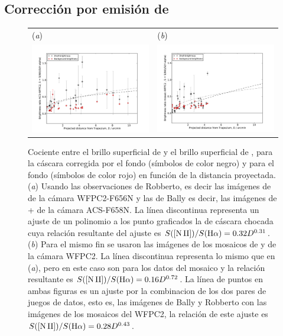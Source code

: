\subsection{Corrección por emisión de \nii{}}
\label{sec:comp}

\begin{figure}[htp]
\centering
\begin{tabular}{l l}
(\textit{a}) & (\textit{b})  \\
  \includegraphics[width=0.48\linewidth, trim=20 9.5 50 20, clip]{./acs_wfpc2-ratio-Nii_ha-vs-D_-mean-error_new}
& \includegraphics[width=0.48\linewidth, trim=20 9.5 50 20, clip]{./wfpc2-mosaic-ratio-Nii_ha-vs-D_-mean-error_new}\\
\end{tabular}
\caption{Cociente entre el brillo superficial de \nii{} y el brillo superficial de \ha{}, para la cáscara corregida por el fondo (símbolos de color negro) y para el fondo (símbolos de color rojo) en función de la distancia proyectada. (\textit{a}) Usando las observaciones de Robberto, es decir las imágenes de \ha{} de la cámara WFPC2-F656N y las de Bally es decir, las imágenes de \ha{}+\nii{} de la cámara ACS-F658N. La línea discontinua representa un ajuste de un polinomio a los punto graficados la de cáscara chocada cuya relación resultante del ajuste es \(S(\mathrm{[N\,II]}{})/S(\mathrm{H}\alpha{})=0.32D^{0.31}\). (\textit{b}) Para el mismo fin se usaron las imágenes de los mosaicos de \ha{} y \nii{} de la cámara WFPC2. La línea discontinua representa lo mismo que en (\textit{a}), pero en este caso son para los datos del mosaico y la relación resultante es \(S(\mathrm{[N\,II]}{})/S(\mathrm{H}\alpha{})=0.16D^{0.72}\). La línea de puntos en ambas figuras es un  ajuste  por la combinacion de los dos pares de juegos de datos, esto es, las imágenes de Bally y Robberto con las imágenes de los mosaicos del WFPC2, la relación de este ajuste es \(S(\mathrm{[N\,II]}{})/S(\mathrm{H}\alpha{})=0.28D^{0.43}\).}\label{fig:ratio-nii-ha}
\end{figure}

